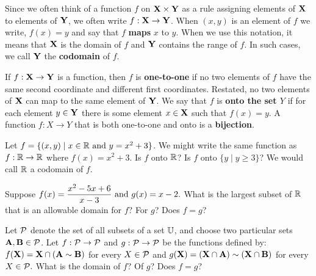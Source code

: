 Since we often think of a function $f$ on $\mathbf X \times \mathbf Y$ as a rule assigning elements of $\mathbf X$ to elements of $\mathbf Y$, we often write $f : \mathbf X \to \mathbf Y$.  When $(x,y)$ is an element of $f$ we write, $f(x)=y$ and say that $f$ \textbf{maps} $x$ to $y$.  When we use this notation, it means that $\mathbf X$ is the domain of $f$ and $\mathbf Y$ contains the range of $f$.  In such cases, we call $\mathbf Y$ the \textbf{codomain} of $f$.

\begin{dfn}
If $f: \mathbf X \to \mathbf Y$ is a function, then $f$ is \textbf{one-to-one} if no two elements of $f$ have the same second coordinate and different first coordinates. Restated, no two elements of $\mathbf X$ can map to the same element of $\mathbf Y$. We say that $f$ is \textbf{onto the set $Y$} if for each element $y \in \mathbf Y$ there is some element $x \in \mathbf X$ such that $f(x) = y.$  A function $f:X \to Y$ that is both one-to-one and onto is %
a \textbf{bijection}.
\end{dfn}

\begin{expl}
Let $f = \{(x,y)  \mid  x\in \mathbb R \mbox{ and } y = x^2 + 3\}$. We might write the same function as $f: \mathbb R \to \mathbb R$ where $f(x) = x^2+3.$ Is $f$ onto $\mathbb R$?   Is $f$ onto  $\{ y  \mid  y \geq 3 \}$? We would call $\mathbb R$ a codomain of $f$.
\end{expl}

\begin{prb}
Suppose $\displaystyle f(x) = \frac{x^2-5x+6}{x-3} \mbox{ and } g(x) = x-2.$  What is the largest subset of $\mathbb R$ that is an allowable domain for $f$?  For $g$? Does $f=g$? \begin{annotation}
\end{annotation}
\end{prb}


\begin{prb}
Let $\mathcal P$ denote the set of all subsets of a set $\mathbb U$, and choose two particular sets $\mathbf A, \mathbf B \in \mathcal P$.  Let $f: \mathcal P \to \mathcal P$ and $g: \mathcal P \to \mathcal P$ be the functions defined by: $f(\mathbf X) = \mathbf X \cap (\mathbf A \sim \mathbf B)$ for every $X \in \mathcal P$ and $g(\mathbf X) = (\mathbf X \cap \mathbf A) \sim (\mathbf X \cap \mathbf B)$ for every $X \in \mathcal P.$  What is the domain of $f$?  Of $g$?  Does $f=g$?
\end{prb}

